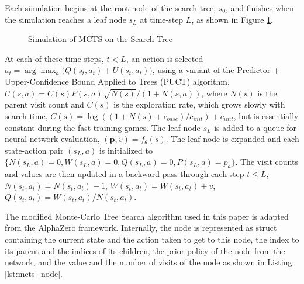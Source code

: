 Each simulation begins at the root node of the search tree, $s_0$, and finishes when the simulation reaches a leaf node $s_L$ at time-step $L$, as shown in Figure \ref{fig:root-to-leaf}.

\begin{figure}[htb]
    \centering
    \caption{Simulation of MCTS on the Search Tree}
    \label{fig:root-to-leaf}
\end{figure}

At each of these time-steps, $t < L$, an action is selected $a_t = \operatorname{arg} \operatorname{max}_a \big(Q(s_t, a_t) + U(s_t, a_t)\big)$, using a variant of the Predictor + Upper-Confidence Bound Applied to Trees (PUCT) algorithm, $U(s, a) =  C(s) P(s, a) \sqrt{N(s)} / (1 + N(s, a))$, where $N(s)$ is the parent visit count and $C(s)$ is the exploration rate, which grows slowly with search time, $C(s) = \log\left((1 + N(s) + c_{base}) / c_{init}\right) + c_{init}$, but is essentially constant during the fast training games. The leaf node $s_L$ is added to a queue for neural network evaluation, $(\mathbf{p}, v) = f_\theta(s)$. The leaf node is expanded and each state-action pair $(s_L, a)$ is initialized to $\{N(s_L, a) = 0, W(s_L, a) = 0, Q(s_L, a) = 0, P(s_L, a) = p_a\}$. The visit counts and values are then updated in a backward pass through each step $t \leq L$, $N(s_t, a_t) = N(s_t, a_t) + 1$, $W(s_t, a_t) = W(s_t, a_t) + v$, $Q(s_t, a_t) = W(s_t,a_t) / N(s_t,a_t)$.

The modified Monte-Carlo Tree Search algorithm used in this paper is adapted from the AlphaZero framework. Internally, the node is represented as struct containing the current state and the action taken to get to this node, the index to its parent and the indices of its children, the prior policy of the node from the network, and the value and the number of visits of the node as shown in Listing \ref{lst:mcts_node}.

